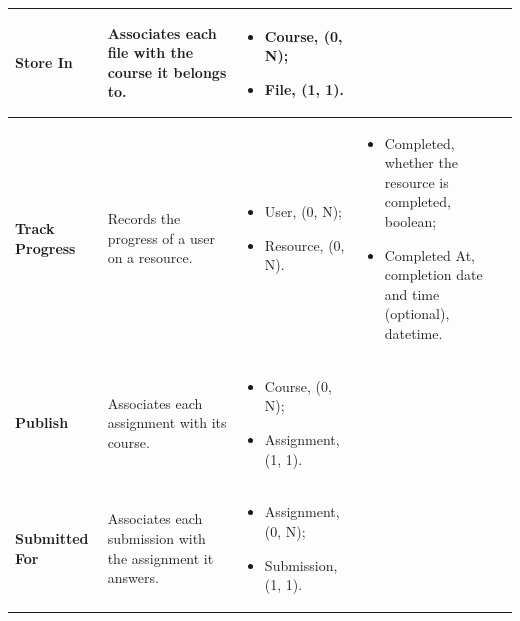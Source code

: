 {\begin{longtable}{|p{}|p{}|p{}|p{}|}
    \textbf{Store In} & Associates each file with the course it belongs to. &
    \begin{itemize}[leftmargin=*,nosep,before=\vspace{-\baselineskip}\leavevmode,after=\vspace{-\baselineskip}]
        \item Course, (0, N);
        \item File, (1, 1).
    \end{itemize}
    &
    
    \\ \hline

    \textbf{Track Progress} & Records the progress of a user on a resource. &
    \begin{itemize}[leftmargin=*,nosep,before=\vspace{-\baselineskip}\leavevmode,after=\vspace{-\baselineskip}]
        \item User, (0, N);
        \item Resource, (0, N).
    \end{itemize}
    &
    \begin{itemize}[leftmargin=*,nosep,before=\vspace{-\baselineskip}\leavevmode,after=\vspace{-\baselineskip}]
        \item Completed, whether the resource is completed, boolean;
        \item Completed At, completion date and time (optional), datetime.
    \end{itemize}
    \\ \hline

    \textbf{Publish} & Associates each assignment with its course. &
    \begin{itemize}[leftmargin=*,nosep,before=\vspace{-\baselineskip}\leavevmode,after=\vspace{-\baselineskip}]
        \item Course, (0, N);
        \item Assignment, (1, 1).
    \end{itemize}
    &
    
    \\ \hline

    \textbf{Submitted For} & Associates each submission with the assignment it answers. &
    \begin{itemize}[leftmargin=*,nosep,before=\vspace{-\baselineskip}\leavevmode,after=\vspace{-\baselineskip}]
        \item Assignment, (0, N);
        \item Submission, (1, 1).
    \end{itemize}
    &
    

\end{longtable}}
